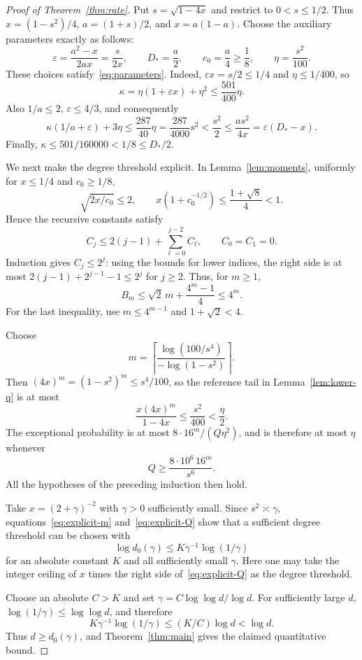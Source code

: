 \documentclass[11pt]{article}
\numberwithin{equation}{section}
\theoremstyle{remark}
\begin{document}
\begin{proof}[Proof of Theorem~\ref{thm:rate}]
Put $s=\sqrt{1-4x}$ and restrict to $0<s\le1/2$. Thus
$x=(1-s^2)/4$, $a=(1+s)/2$, and $x=a(1-a)$.
Choose the auxiliary parameters exactly as follows:
\[
 \varepsilon=\frac{a^2-x}{2ax}=\frac{s}{2x},\qquad
 D_*=\frac a2,\qquad c_0=\frac a4\ge\frac18,\qquad
 \eta=\frac{s^2}{100}.
\]
These choices satisfy~\eqref{eq:parameters}. Indeed,
$\varepsilon x=s/2\le1/4$ and $\eta\le1/400$, so
\[
 \kappa=\eta(1+\varepsilon x)+\eta^2
 \le\frac{501}{400}\eta.
\]
Also $1/a\le2$, $\varepsilon\le4/3$, and consequently
\[
 \kappa(1/a+\varepsilon)+3\eta
 \le\frac{287}{40}\eta
 =\frac{287}{4000}s^2
 <\frac{s^2}{2}
 \le\frac{as^2}{4x}
 =\varepsilon(D_*-x).
\]
Finally, $\kappa\le501/160000<1/8\le D_*/2$.

We next make the degree threshold explicit. In
Lemma~\ref{lem:moments}, uniformly for $x\le1/4$ and $c_0\ge1/8$,
\[
 \sqrt{2x/c_0}\le2,\qquad
 x(1+c_0^{-1/2})\le\frac{1+\sqrt8}{4}<1.
\]
Hence the recursive constants satisfy
\[
 C_j\le2(j-1)+\sum_{\ell=0}^{j-2}C_\ell,\qquad C_0=C_1=0.
\]
Induction gives $C_j\le2^j$: using the bounds for lower indices, the
right side is at most $2(j-1)+2^{j-1}-1\le2^j$ for $j\ge2$.
Thus, for $m\ge1$,
\[
 B_m\le\sqrt2\,m+\frac{4^m-1}{4}\le4^m.
\]
For the last inequality, use $m\le4^{m-1}$ and $1+\sqrt2<4$.

Choose
\begin{equation}\label{eq:explicit-m}
 m=\left\lceil
       \frac{\log(100/s^4)}{-\log(1-s^2)}
    \right\rceil.
\end{equation}
Then $(4x)^m=(1-s^2)^m\le s^4/100$, so the reference tail in
Lemma~\ref{lem:lower-q} is at most
\[
 \frac{x(4x)^m}{1-4x}\le\frac{s^2}{400}<\frac{\eta}{2}.
\]
The exceptional probability is at most
$8\cdot16^m/(Q\eta^2)$, and is therefore at most $\eta$ whenever
\begin{equation}\label{eq:explicit-Q}
 Q\ge \frac{8\cdot10^6\,16^m}{s^6}.
\end{equation}
All the hypotheses of the preceding induction then hold.

Take $x=(2+\gamma)^{-2}$ with $\gamma>0$ sufficiently small.
Since $s^2\asymp\gamma$, equations~\eqref{eq:explicit-m}
and~\eqref{eq:explicit-Q} show that a sufficient degree threshold
can be chosen with
\begin{equation}\label{eq:d-threshold}
 \log d_0(\gamma)
 \le K\gamma^{-1}\log(1/\gamma)
\end{equation}
for an absolute constant $K$ and all sufficiently small $\gamma$.
Here one may take the integer ceiling of $x$ times the right side
of~\eqref{eq:explicit-Q} as the degree threshold.

Choose an absolute $C>K$ and set
$\gamma=C\log\log d/\log d$. For sufficiently large $d$,
$\log(1/\gamma)\le\log\log d$, and therefore
\[
 K\gamma^{-1}\log(1/\gamma)
 \le(K/C)\log d<\log d.
\]
Thus $d\ge d_0(\gamma)$, and Theorem~\ref{thm:main} gives the
claimed quantitative bound.
\end{proof}
\end{document}
